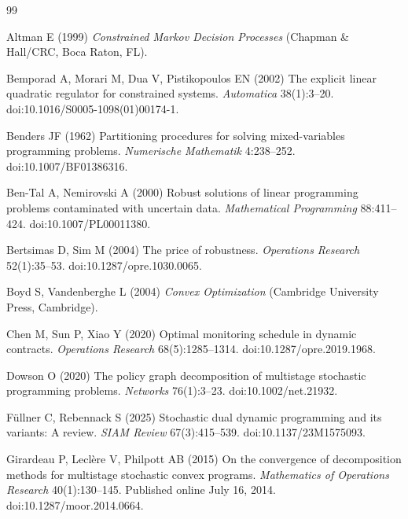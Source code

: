 \begin{thebibliography}{99}\raggedright
{}
Altman E (1999) \emph{Constrained Markov Decision Processes} (Chapman \& Hall/CRC, Boca Raton, FL).

Bemporad A, Morari M, Dua V, Pistikopoulos EN (2002) The explicit linear quadratic regulator for constrained systems. \emph{Automatica} 38(1):3--20. doi:10.1016/S0005-1098(01)00174-1.

Benders JF (1962) Partitioning procedures for solving mixed-variables programming problems. \emph{Numerische Mathematik} 4:238--252. doi:10.1007/BF01386316.

Ben-Tal A, Nemirovski A (2000) Robust solutions of linear programming problems contaminated with uncertain data. \emph{Mathematical Programming} 88:411--424. doi:10.1007/PL00011380.

Bertsimas D, Sim M (2004) The price of robustness. \emph{Operations Research} 52(1):35--53. doi:10.1287/opre.1030.0065.

Boyd S, Vandenberghe L (2004) \emph{Convex Optimization} (Cambridge University Press, Cambridge).

Chen M, Sun P, Xiao Y (2020) Optimal monitoring schedule in dynamic contracts. \emph{Operations Research} 68(5):1285--1314. doi:10.1287/opre.2019.1968.

Dowson O (2020) The policy graph decomposition of multistage stochastic programming problems. \emph{Networks} 76(1):3--23. doi:10.1002/net.21932.

F\"ullner C, Rebennack S (2025) Stochastic dual dynamic programming and its variants: A review. \emph{SIAM Review} 67(3):415--539. doi:10.1137/23M1575093.

Girardeau P, Lecl\`ere V, Philpott AB (2015) On the convergence of decomposition methods for multistage stochastic convex programs. \emph{Mathematics of Operations Research} 40(1):130--145. Published online July 16, 2014. doi:10.1287/moor.2014.0664.


\end{thebibliography}
